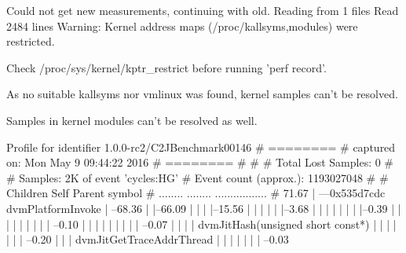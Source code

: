 Could not get new measurements, continuing with old.
Reading from 1 files
Read 2484 lines
Warning:
Kernel address maps (/proc/{kallsyms,modules}) were restricted.

Check /proc/sys/kernel/kptr_restrict before running 'perf record'.

As no suitable kallsyms nor vmlinux was found, kernel samples
can't be resolved.

Samples in kernel modules can't be resolved as well.

Profile for identifier 1.0.0-rc2/C2JBenchmark00146
# ========
# captured on: Mon May  9 09:44:22 2016
# ========
#
#
# Total Lost Samples: 0
#
# Samples: 2K of event 'cycles:HG'
# Event count (approx.): 1193027048
#
# Children      Self  Parent symbol    
# ........  ........  .................
#
    71.67%
            |
            ---0x535d7cdc
               dvmPlatformInvoke
               |          
                --68.36%
                          |          
                          |--66.09%
                          |          |          
                          |          |--15.56%
                          |          |          |          
                          |          |          |--3.68%
                          |          |          |          |          
                          |          |          |          |--0.39%
                          |          |          |          |          |          
                          |          |          |          |           --0.10%
                          |          |          |          |                     |          
                          |          |          |          |                      --0.07%
                          |          |          |          |                                dvmJitHash(unsigned short const*)
                          |          |          |          |          
                          |          |          |           --0.20%
                          |          |          |                     dvmJitGetTraceAddrThread
                          |          |          |                     |          
                          |          |          |                      --0.03%
